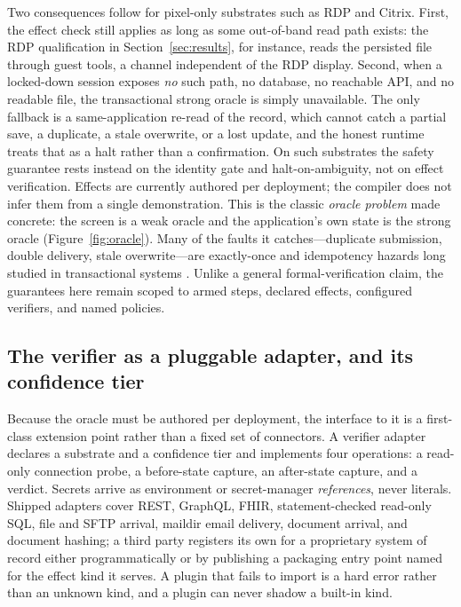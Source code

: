 Two consequences follow for pixel-only substrates such as RDP and Citrix. First,
the effect check still applies as long as some out-of-band read path exists: the
RDP qualification in Section~\ref{sec:results}, for instance, reads the persisted
file through guest tools, a channel independent of the RDP display. Second, when
a locked-down session exposes \emph{no} such path, no database, no reachable API,
and no readable file, the transactional strong oracle is simply unavailable. The
only fallback is a same-application re-read of the record, which cannot catch a
partial save, a duplicate, a stale overwrite, or a lost update, and the honest
runtime treats that as a halt rather than a confirmation. On such substrates the
safety guarantee rests instead on the identity gate and halt-on-ambiguity, not on
effect verification. Effects are currently authored per deployment; the compiler
does not infer them from a single demonstration. This is the classic \emph{oracle
problem}
\cite{barr2015oracle} made concrete: the screen is a weak oracle and the
application's own state is the strong oracle (Figure~\ref{fig:oracle}). Many of
the faults it catches---duplicate submission, double delivery, stale
overwrite---are exactly-once and idempotency hazards long studied in
transactional systems \cite{gray1981transaction}. Unlike a general
formal-verification claim, the guarantees here remain scoped to armed steps,
declared effects, configured verifiers, and named policies.

\subsection{The verifier as a pluggable adapter, and its confidence tier}
Because the oracle must be authored per deployment, the interface to it is a
first-class extension point rather than a fixed set of connectors. A verifier
adapter declares a substrate and a confidence tier and implements four
operations: a read-only connection probe, a before-state capture, an
after-state capture, and a verdict. Secrets arrive as environment or
secret-manager \emph{references}, never literals. Shipped adapters cover REST,
GraphQL, FHIR, statement-checked read-only SQL, file and SFTP arrival, maildir
email delivery, document arrival, and document hashing; a third party
registers its own for a proprietary system of record either programmatically or
by publishing a packaging entry point named for the effect kind it serves. A
plugin that fails to import is a hard error rather than an unknown kind, and a
plugin can never shadow a built-in kind.

